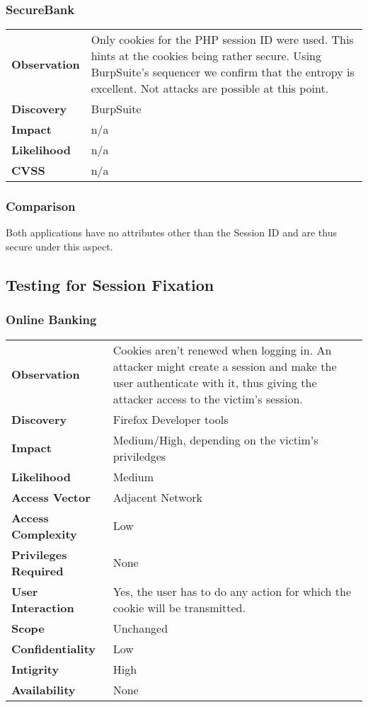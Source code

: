 \subsubsection*{SecureBank}

\begin{tabular}{l|p{10cm}}
\textbf{Observation} & Only cookies for the PHP session ID were used. This hints at the cookies being rather secure. Using BurpSuite's sequencer we confirm that the entropy is excellent. Not attacks are possible at this point. \\
\textbf{Discovery} & BurpSuite \\
\textbf{Impact} & n/a \\
\textbf{Likelihood} & n/a \\
\textbf{CVSS} & n/a \\
\end{tabular}

\subsubsection*{Comparison}
Both applications have no attributes other than the Session ID and are thus secure under this aspect.

\clearpage


\subsection{Testing for Session Fixation}

\subsubsection*{Online Banking}

\begin{tabular}{l|p{10cm}}
\textbf{Observation} & Cookies aren't renewed when logging in. An attacker might create a session and make the user authenticate with it, thus giving the attacker access to the victim's session. \\
\textbf{Discovery} & Firefox Developer tools \\
\textbf{Impact} & Medium/High, depending on the victim's priviledges \\
\textbf{Likelihood} & Medium \\
\textbf{Access Vector} & Adjacent Network \\
\textbf{Access Complexity} & Low\\
\textbf{Privileges Required} & None \\
\textbf{User Interaction} & Yes, the user has to do any action for which the cookie will be transmitted. \\
\textbf{Scope} & Unchanged \\
\textbf{Confidentiality} & Low \\
\textbf{Intigrity} & High\\
\textbf{Availability} & None \\
\end{tabular}

